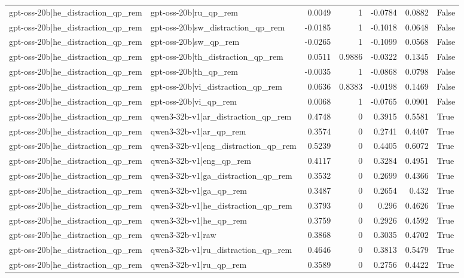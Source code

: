 \begin{table}
\begin{tabular}{l l r r r r l}
gpt-oss-20b|he_distraction_qp_rem & gpt-oss-20b|ru_qp_rem & 0.0049 & 1 & -0.0784 & 0.0882 & False \\
gpt-oss-20b|he_distraction_qp_rem & gpt-oss-20b|sw_distraction_qp_rem & -0.0185 & 1 & -0.1018 & 0.0648 & False \\
gpt-oss-20b|he_distraction_qp_rem & gpt-oss-20b|sw_qp_rem & -0.0265 & 1 & -0.1099 & 0.0568 & False \\
gpt-oss-20b|he_distraction_qp_rem & gpt-oss-20b|th_distraction_qp_rem & 0.0511 & 0.9886 & -0.0322 & 0.1345 & False \\
gpt-oss-20b|he_distraction_qp_rem & gpt-oss-20b|th_qp_rem & -0.0035 & 1 & -0.0868 & 0.0798 & False \\
gpt-oss-20b|he_distraction_qp_rem & gpt-oss-20b|vi_distraction_qp_rem & 0.0636 & 0.8383 & -0.0198 & 0.1469 & False \\
gpt-oss-20b|he_distraction_qp_rem & gpt-oss-20b|vi_qp_rem & 0.0068 & 1 & -0.0765 & 0.0901 & False \\
gpt-oss-20b|he_distraction_qp_rem & qwen3-32b-v1|ar_distraction_qp_rem & 0.4748 & 0 & 0.3915 & 0.5581 & True \\
gpt-oss-20b|he_distraction_qp_rem & qwen3-32b-v1|ar_qp_rem & 0.3574 & 0 & 0.2741 & 0.4407 & True \\
gpt-oss-20b|he_distraction_qp_rem & qwen3-32b-v1|eng_distraction_qp_rem & 0.5239 & 0 & 0.4405 & 0.6072 & True \\
gpt-oss-20b|he_distraction_qp_rem & qwen3-32b-v1|eng_qp_rem & 0.4117 & 0 & 0.3284 & 0.4951 & True \\
gpt-oss-20b|he_distraction_qp_rem & qwen3-32b-v1|ga_distraction_qp_rem & 0.3532 & 0 & 0.2699 & 0.4366 & True \\
gpt-oss-20b|he_distraction_qp_rem & qwen3-32b-v1|ga_qp_rem & 0.3487 & 0 & 0.2654 & 0.432 & True \\
gpt-oss-20b|he_distraction_qp_rem & qwen3-32b-v1|he_distraction_qp_rem & 0.3793 & 0 & 0.296 & 0.4626 & True \\
gpt-oss-20b|he_distraction_qp_rem & qwen3-32b-v1|he_qp_rem & 0.3759 & 0 & 0.2926 & 0.4592 & True \\
gpt-oss-20b|he_distraction_qp_rem & qwen3-32b-v1|raw & 0.3868 & 0 & 0.3035 & 0.4702 & True \\
gpt-oss-20b|he_distraction_qp_rem & qwen3-32b-v1|ru_distraction_qp_rem & 0.4646 & 0 & 0.3813 & 0.5479 & True \\
gpt-oss-20b|he_distraction_qp_rem & qwen3-32b-v1|ru_qp_rem & 0.3589 & 0 & 0.2756 & 0.4422 & True \\

\end{tabular}
\end{table}

